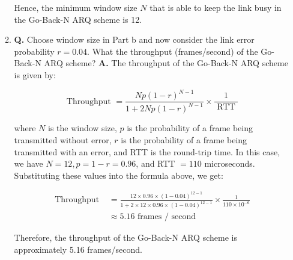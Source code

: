 \documentclass[main.tex]{subfiles}
\begin{document}
\begin{enumerate}
\begin{enumerate}
        Hence, the minimum window size $N$ that is able to keep the link busy in the Go-Back-N ARQ scheme is 12.
        
        \item \textbf{Q.} Choose window size in Part b and now consider the link error probability $r=0.04$. What the throughput (frames/second) of the Go-Back-N ARQ scheme? \textbf{A.} The throughput of the Go-Back-N ARQ scheme is given by:
        
        $$
        \text { Throughput }=\frac{N p(1-r)^{N-1}}{1+2 N p(1-r)^{N-1}} \times \frac{1}{\text { RTT }}
        $$
        
        where $N$ is the window size, $p$ is the probability of a frame being transmitted without error, $r$ is the probability of a frame being transmitted with an error, and RTT is the round-trip time.
        In this case, we have $N=12, p=1-r=0.96$, and RTT $=110$ microseconds. Substituting these values into the formula above, we get:
        
        $$
        \begin{aligned}
        \text { Throughput }&=\frac{12 \times 0.96 \times(1-0.04)^{12-1}}{1+2 \times 12 \times 0.96 \times(1-0.04)^{12-1}} \times \frac{1}{110 \times 10^{-6}}\\ &\approx 5.16 \text { frames } / \text { second }
        \end{aligned}
        $$
        
        Therefore, the throughput of the Go-Back-N ARQ scheme is approximately 5.16 frames/second.
    \end{enumerate}

\end{enumerate}
\end{document}
